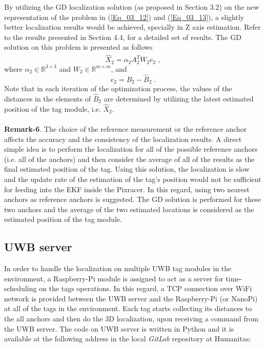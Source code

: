 \documentclass{article}
\begin{document}
By utilizing the GD localization solution (as proposed in Section 3.2) on the new representation of the problem in (\ref{Eq_03_12}) and (\ref{Eq_03_13}), a slightly better localization results would be achieved, specially in Z axis estimation. Refer to the results presented in Section 4.4, for a detailed set of results.
The GD solution on this problem is presented as follows
\begin{equation} \label{Eq_03_14}
\dot{\hat{X}}_2 = \alpha_2 A_2^T W_2 e_2 \;,
\end{equation}
where $\alpha_2 \in \mathbb{R}^{3\times3}$ and $W_2 \in \mathbb{R}^{m\times m}$, and
\begin{equation} \label{Eq_03_15}
e_2 = B_2 - \hat{B}_2 \;.
\end{equation}
Note that in each iteration of the optimization process, the values of the distances in the elements of $\hat{B}_2$ are determined by utilizing the latest estimated position of the tag module, i.e. $\hat{X}_2$. \\
\\
\textbf{Remark-6}. The choice of the reference measurement or the reference anchor affects the accuracy and the consistency of the localization results. A direct simple idea is to perform the localization for all of the possible reference anchors (i.e. all of the anchors) and then consider the average of all of the results as the final estimated position of the tag. Using this solution, the localization is slow and the update rate of the estimation of the tag's position would not be sufficient for feeding into the EKF inside the Pixracer. 
In this regard, using two nearest anchors as reference anchors is suggested. The GD solution is performed for these two anchors and the average of the two estimated locations is considered as the estimated position of the tag module.


\subsection{UWB server}
In order to handle the localization on multiple UWB tag modules in the environment, a Raspberry-Pi module is assigned to act as a server for time-scheduling on the tags operations. 
In this regard, a TCP connection over WiFi network is provided between the UWB server and the Raspberry-Pi (or NanoPi) at all of the tags in the environment. 
Each tag starts collecting its distances to the all anchors and then do the 3D localization, upon receiving a command from the UWB server.
The code on UWB server is written in Python and it is available at the following address in the local \textit{GitLab} repository at Humanitas:
\end{document}
